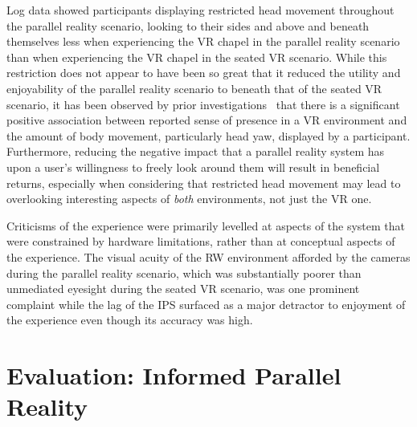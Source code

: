 Log data showed participants displaying restricted head movement throughout the parallel reality scenario, looking to their sides and above and beneath themselves less when experiencing the VR chapel in the parallel reality scenario than when experiencing the VR chapel in the seated VR scenario. While this restriction does not appear to have been so great that it reduced the utility and enjoyability of the parallel reality scenario to beneath that of the seated VR scenario, it has been observed by prior investigations~\cite{Slater1998} that there is a significant positive association between reported sense of presence in a VR environment and the amount of body movement, particularly head yaw, displayed by a participant. Furthermore, reducing the negative impact that a parallel reality system has upon a user's willingness to freely look around them will result in beneficial returns, especially when considering that restricted head movement may lead to overlooking interesting aspects of \textit{both} environments, not just the VR one.

Criticisms of the experience were primarily levelled at aspects of the system that were constrained by hardware limitations, rather than at conceptual aspects of the experience. The visual acuity of the RW environment afforded by the cameras during the parallel reality scenario, which was substantially poorer than unmediated eyesight during the seated VR scenario, was one prominent complaint while the lag of the IPS surfaced as a major detractor to enjoyment of the experience even though its accuracy was high.



\chapter{Evaluation: Informed Parallel Reality}


